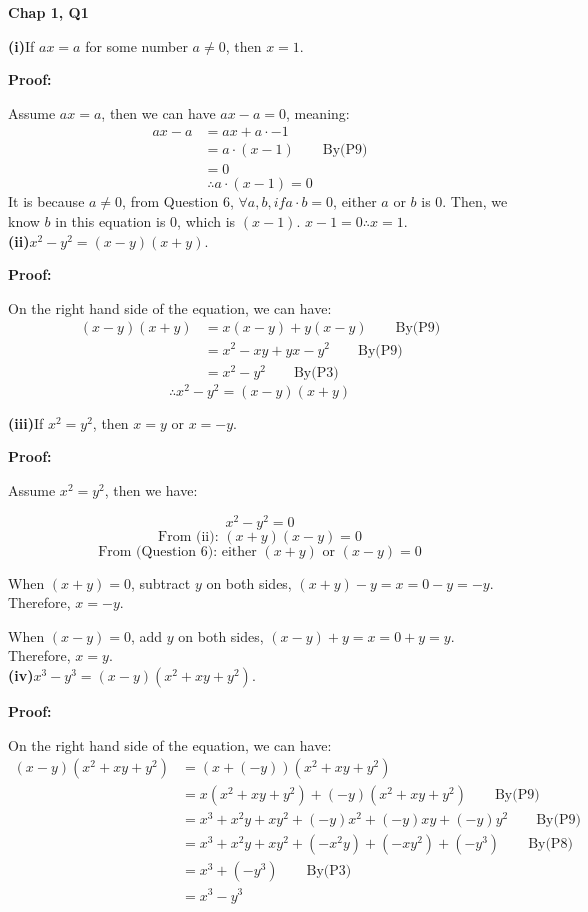 \documentclass[a4paper,12pt]{report}
\begin{document}
\pagebreak

\noindent
\textbf{Chap 1, Q1} 

\noindent
\textbf{(i)}If $ax=a$ for some number $a\neq0$, then $x=1$.

\noindent
\textbf{Proof:}

\noindent
Assume $ax = a$, then we can have $ax-a=0$, meaning:
\begin{align*}
 ax-a & = ax+a\cdot{-1}\\
 & =a\cdot{(x-1)}\qquad \text{By(P9)}\\
 & =0
\end{align*}
\[\therefore a\cdot{(x-1)}=0 \]
It is because $a\neq 0$, from Question 6, $\forall a,b, if a\cdot{b}=0$, either $a$ or $b$ is $0$. Then, we know $b$ in this equation is 0, which is $(x-1)$. $x-1=0 \therefore x=1$.\\

\noindent
\textbf{(ii)}$x^2-y^2=(x-y)(x+y)$.

\noindent
\textbf{Proof:}

\noindent
On the right hand side of the equation, we can have:
\begin{align*}
 (x-y)(x+y) & = x(x-y)+y(x-y)\qquad \text{By(P9)}\\
 & =x^2-xy+yx-y^2\qquad \text{By(P9)}\\
 & =x^2-y^2\qquad\text{By(P3)}
\end{align*}
\[\therefore x^2-y^2=(x-y)(x+y)\]

\noindent
\textbf{(iii)}If $x^2=y^2$, then $x=y$ or $x=-y$.

\noindent
\textbf{Proof:}

\noindent
Assume $x^2=y^2$, then we have:

\[x^2-y^2=0\]
\[\text{From (ii): } (x+y)(x-y)=0 \]
\[\text{From (Question 6): either } (x+y)\text{ or }(x-y)=0 \]

\noindent
When $(x+y)=0$, subtract $y$ on both sides, $(x+y)-y=x=0-y=-y$. Therefore, $x=-y$.

\noindent
When $(x-y)=0$, add $y$ on both sides, $(x-y)+y=x=0+y=y$. Therefore, $x=y$.\\

\noindent
\textbf{(iv)}$x^3-y^3=(x-y)(x^2+xy+y^2)$.

\noindent
\textbf{Proof:}

\noindent
On the right hand side of the equation, we can have:
\begin{align*}
 (x-y)(x^2+xy+y^2) & =(x+(-y))(x^2+xy+y^2)\\
 & =x(x^2+xy+y^2)+(-y)(x^2+xy+y^2)\qquad \text{By(P9)}\\
 & =x^3+x^2y+xy^2+(-y)x^2+(-y)xy+(-y)y^2\qquad\text{By(P9)}\\
 & =x^3+x^2y+xy^2+(-x^2y)+(-xy^2)+(-y^3)\qquad\text{By(P8)}\\
 & =x^3+(-y^3)\qquad\text{By(P3)}\\
 & =x^3-y^3
\end{align*}
\end{document}
